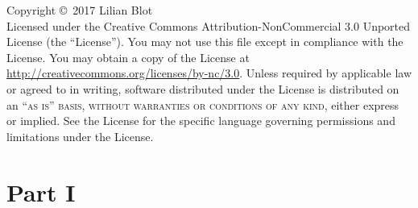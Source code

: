 \documentclass[11pt, fleqn]{book} %
\begin{document}
\noindent Copyright \copyright\ 2017 Lilian Blot\\ %

%

\noindent Licensed under the Creative Commons Attribution-NonCommercial 3.0 Unported License (the ``License''). You may not use this file except in compliance with the License. You may obtain a copy of the License at \url{http://creativecommons.org/licenses/by-nc/3.0}. Unless required by applicable law or agreed to in writing, software distributed under the License is distributed on an \textsc{``as is'' basis, without warranties or conditions of any kind}, either express or implied. See the License for the specific language governing permissions and limitations under the License.\\ %







\pagestyle{empty} %

\tableofcontents %

\cleardoublepage %

\pagestyle{fancy} %



\part{Part I}

\end{document}
